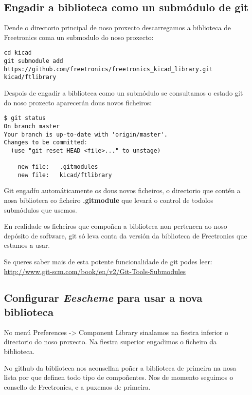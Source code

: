 \documentclass[12pt,galician,]{article}
\begin{document}
\subsection{Engadir a biblioteca como un submódulo de
git}\label{engadir-a-biblioteca-como-un-submuxf3dulo-de-git}

Dende o directorio principal de noso proxecto descarregamos a biblioteca
de Freetronics coma un submodulo do noso proxecto:

\begin{verbatim}
cd kicad 
git submodule add https://github.com/freetronics/freetronics_kicad_library.git kicad/ftlibrary
\end{verbatim}

Despois de engadir a biblioteca como un submódulo se consultamos o
estado git do noso proxecto aparecerán dous novos ficheiros:

\begin{verbatim}
$ git status
On branch master
Your branch is up-to-date with 'origin/master'.
Changes to be committed:
  (use "git reset HEAD <file>..." to unstage)

    new file:   .gitmodules
    new file:   kicad/ftlibrary
\end{verbatim}

Git engadíu automáticamente os dous novos ficheiros, o directorio que
contén a nosa biblioteca eo ficheiro \textbf{.gitmodule} que levará o
control de todolos submódulos que usemos.

En realidade os ficheiros que compoñen a biblioteca non pertencen ao
noso depósito de software, git só leva conta da versión da biblioteca de
Freetronics que estamos a usar.

Se queres saber mais de esta potente funcionalidade de git podes leer:
\url{http://www.git-scm.com/book/en/v2/Git-Tools-Submodules}

\subsection{\texorpdfstring{Configurar \emph{Eescheme} para usar a nova
biblioteca}{Configurar Eescheme para usar a nova biblioteca}}\label{configurar-eescheme-para-usar-a-nova-biblioteca}

No menú Preferences -\textgreater{} Component Library sinalamos na
fiestra inferior o directorio do noso proxecto. Na fiestra superior
engadimos o ficheiro da biblioteca.

No github da biblioteca nos aconsellan poñer a biblioteca de primeira na
nosa lista por que definen todo tipo de compoñentes. Nos de momento
seguimos o consello de Freetronics, e a puxemos de primeira.
\end{document}

